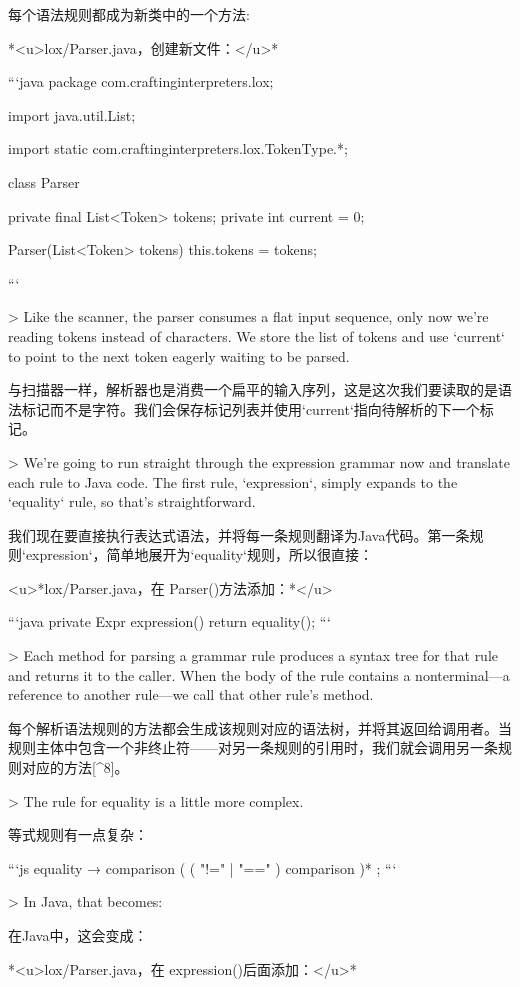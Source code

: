 \documentclass[cn,11pt,chinese]{elegantbook}
\begin{document}
每个语法规则都成为新类中的一个方法:

*<u>lox/Parser.java，创建新文件：</u>*

```java
package com.craftinginterpreters.lox;

import java.util.List;

import static com.craftinginterpreters.lox.TokenType.*;

class Parser {
  private final List<Token> tokens;
  private int current = 0;

  Parser(List<Token> tokens) {
    this.tokens = tokens;
  }
}
```

> Like the scanner, the parser consumes a flat input sequence, only now we’re reading tokens instead of characters. We store the list of tokens and use `current` to point to the next token eagerly waiting to be parsed.

与扫描器一样，解析器也是消费一个扁平的输入序列，这是这次我们要读取的是语法标记而不是字符。我们会保存标记列表并使用`current`指向待解析的下一个标记。

> We’re going to run straight through the expression grammar now and translate each rule to Java code. The first rule, `expression`, simply expands to the `equality` rule, so that’s straightforward.

我们现在要直接执行表达式语法，并将每一条规则翻译为Java代码。第一条规则`expression`，简单地展开为`equality`规则，所以很直接：

<u>*lox/Parser.java，在 Parser()方法添加：*</u>

```java
  private Expr expression() {
    return equality();
  }
```

> Each method for parsing a grammar rule produces a syntax tree for that rule and returns it to the caller. When the body of the rule contains a nonterminal—a reference to another rule—we call that other rule’s method.

每个解析语法规则的方法都会生成该规则对应的语法树，并将其返回给调用者。当规则主体中包含一个非终止符——对另一条规则的引用时，我们就会调用另一条规则对应的方法[^8]。

> The rule for equality is a little more complex.

等式规则有一点复杂：

```js
equality       → comparison ( ( "!=" | "==" ) comparison )* ;
```

> In Java, that becomes:

在Java中，这会变成：

*<u>lox/Parser.java，在 expression()后面添加：</u>*
\end{document}
